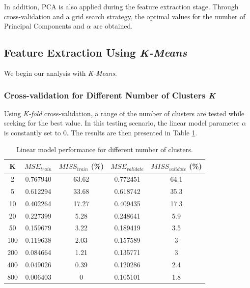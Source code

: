 \documentclass{article}
\begin{document}
In addition, PCA is also applied during the feature extraction stage. Through cross-validation and a grid search strategy, the optimal values for the number of Principal Components and $\alpha$ are obtained.

\subsection{Feature Extraction Using \textit{K-Means}} \label{sec:k-means}

We begin our analysis with \textit{K-Means}.

\subsubsection{Cross-validation for Different Number of Clusters \textit{K}} \label{sec:cv_k_means}

Using \textit{K-fold} cross-validation, a range of the number of clusters are tested while seeking for the best value. In this testing scenario, the linear model parameter $\alpha$ is constantly set to 0. The results are then presented in Table \ref{table:diff_k}.

\begin{table}[h!]
\begin{center}
 \begin{tabular}{||c | c | c | c | c||} 
 \hline
 K & $MSE_{train}$ & $MISS_{train}$ (\%) & $MSE_{validate}$ & $MISS_{validate}$ (\%) \\ [0.5ex]
 \hline\hline
 2 & 0.767940 & 63.62 & 0.772451 & 64.1\\ 
 \hline
 5 & 0.612294 & 33.68 & 0.618742 & 35.3\\
 \hline
 10 & 0.402264 & 17.27 & 0.409435 & 17.3\\
 \hline
 20 & 0.227399 & 5.28 & 0.248641 & 5.9\\
 \hline
 50 & 0.159679 & 3.22 & 0.189419 & 3.5\\
 \hline
  100 & 0.119638 & 2.03 & 0.157589 & 3\\
 \hline
  200 & 0.084664 & 1.21 & 0.135771 & 3\\
 \hline
  400 & 0.049026 & 0.39 & 0.120286 & 2.4\\
 \hline
  800 & 0.006403 & 0 & 0.105101 & 1.8\\
 \hline
\end{tabular}
\caption{Linear model performance for different number of clusters.}
\label{table:diff_k}
\end{center}
\end{table}
\end{document}
